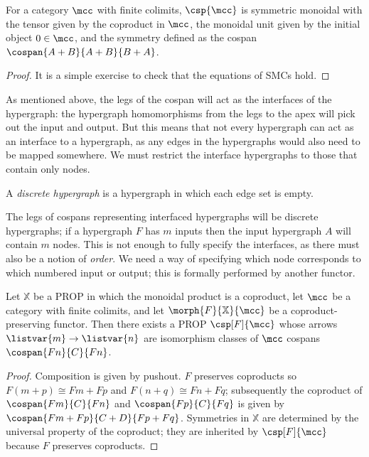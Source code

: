 \begin{lemma}
    For a category \(\mcc\) with finite colimits,
    \(\csp{\mcc}\) is symmetric monoidal with the tensor given by the
    coproduct in \(\mcc\), the monoidal unit given by the initial object
    \(0 \in \mcc\), and the symmetry defined as the cospan
    \(\cospan{A+B}{A+B}{B+A}\).
\end{lemma}
\begin{proof}
    It is a simple exercise to check that the equations of SMCs hold.
\end{proof}

As mentioned above, the legs of the cospan will act as the interfaces of the
hypergraph: the hypergraph homomorphisms from the legs to the apex will pick out
the input and output.
But this means that not every hypergraph can act as an interface to a
hypergraph, as any edges in the hypergraphs would also need to be mapped
somewhere.
We must restrict the interface hypergraphs to those that contain only nodes.

\begin{definition}
    A \emph{discrete hypergraph} is a hypergraph in which each edge set is
    empty.
\end{definition}

The legs of cospans representing interfaced hypergraphs will be discrete
hypergraphs; if a hypergraph \(F\) has \(m\) inputs then the input hypergraph
\(A\) will contain \(m\) nodes.
This is not enough to fully specify the interfaces, as there must also be a
notion of \emph{order}.
We need a way of specifying which node corresponds to which numbered input or
output; this is formally performed by another functor.

\begin{theorem}\label{thm:csp-construction}
    Let \(\mathbb{X}\) be a PROP in which the monoidal product is a coproduct,
    let \(\mcc\) be a category with finite colimits, and
    let \(\morph{F}{\mathbb{X}}{\mcc}\) be a coproduct-preserving functor.
    Then there exists a PROP \(\csp[F]{\mcc}\) whose arrows
    \(\listvar{m} \to \listvar{n}\) are isomorphism classes of \(\mcc\)
    cospans \(\cospan{Fn}{C}{Fn}\).
\end{theorem}
\begin{proof}
    Composition is given by pushout.
    \(F\) preserves coproducts so \(F(m+p) \cong Fm + Fp\) and
    \(F(n+q) \cong Fn + Fq\); subsequently the coproduct of
    \(\cospan{Fm}{C}{Fn}\) and \(\cospan{Fp}{C}{Fq}\) is given by \(
    \cospan{Fm + Fp}{C + D}{Fp + Fq}
    \).
    Symmetries in \(\mathbb{X}\) are determined by the universal property of
    the coproduct; they are inherited by \(\csp[F]{\mcc}\) because \(F\)
    preserves coproducts.
\end{proof}

